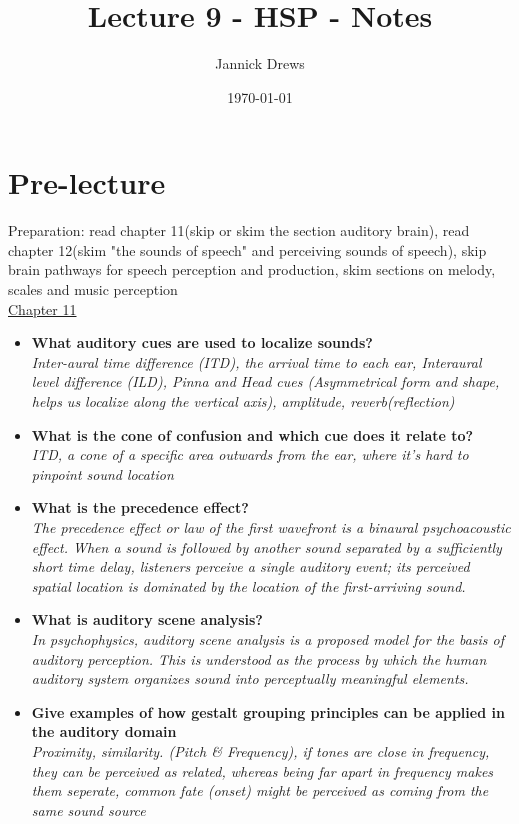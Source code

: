 \documentclass{article}
\title{Lecture 9 - HSP - Notes}
\author{Jannick Drews}
\date{\today}
\begin{document}
\maketitle
\newpage

\section{Pre-lecture}
Preparation: read chapter 11(skip or skim the section auditory brain), read chapter 12(skim "the sounds of speech" and perceiving sounds of speech), skip brain pathways for speech perception and production, skim sections on melody, scales and music perception\\
\underline{Chapter 11}
\begin{itemize}
    \item \textbf{What auditory cues are used to localize sounds?}\\
        \textit{Inter-aural time difference (ITD), the arrival time to each ear, Interaural level difference (ILD), Pinna and Head cues (Asymmetrical form and shape, helps us localize along the vertical axis), amplitude, reverb(reflection)}
    \item \textbf{What is the cone of confusion and which cue does it relate to?}\\
        \textit{ITD, a cone of a specific area outwards from the ear, where it's hard to pinpoint sound location}
    \item \textbf{What is the precedence effect?}\\
        \textit{The precedence effect or law of the first wavefront is a binaural psychoacoustic effect. When a sound is followed by another sound separated by a sufficiently short time delay, listeners perceive a single auditory event; its perceived spatial location is dominated by the location of the first-arriving sound.}
    \item \textbf{What is auditory scene analysis?}\\
        \textit{In psychophysics, auditory scene analysis is a proposed model for the basis of auditory perception. This is understood as the process by which the human auditory system organizes sound into perceptually meaningful elements.}
    \item \textbf{Give examples of how gestalt grouping principles can be applied in the auditory domain}\\
        \textit{Proximity, similarity. (Pitch \& Frequency), if tones are close in frequency, they can be perceived as related, whereas being far apart in frequency makes them seperate, common fate (onset) might be perceived as coming from the same sound source}
\end{itemize}
\end{document}
